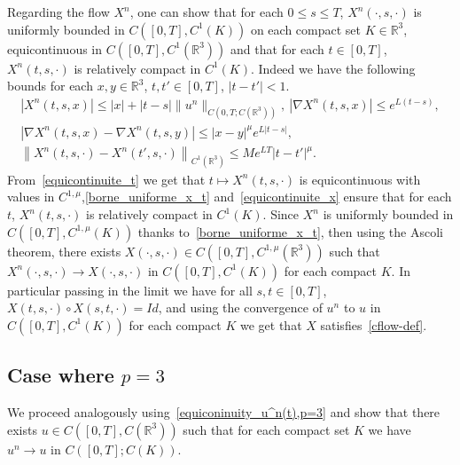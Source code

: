 \documentclass[10pt]{amsart}
\theoremstyle{definition}\newtheorem{defi}[theo]{Definition}\newtheorem{rema}[theo]{Remark}\newtheorem{exam}[theo]{Example}\newtheorem{exem}[theo]{Example}\newtheorem{nota}[theo]{Notation}
\newcommand{\R}{\mathbb{R}}
\renewcommand{\leq}{\leqslant}
\begin{document}
Regarding the flow $X^n$, one can show that for each $0 \leq s\leq T $, $X^n(\cdot,s,\cdot) $ is uniformly bounded in $ C([0,T], C^{1}(K))$ on each compact set $K\in \R^3$, equicontinuous in $ C([0,T], C^{1}(\R^3))$ and that for each $t\in[0,T]$, $X^n(t,s,\cdot)$ is relatively compact in $ C^{1}(K)$. Indeed we have the following bounds for each $x,y \in \R^3 $, $t,t'\in[0,T]$, $|t-t'|<1$.
\begin{gather}
\left|X^n(t,s,x)\right| \leq |x|+ |t-s| \|u^n\|_{ C\left(0,T; C(\R^3)\right)},\: \left|\nabla X^n(t,s,x)\right|\leq e^{L(t-s)},\label{borne_uniforme_x_t}
\\ 
\left|\nabla X^n(t,s,x)-\nabla X^n(t,s,y)\right| \leq |x-y|^\mu e^{L |t-s|},\label{equicontinuite_x}
\\ 
\left\|X^n(t,s,\cdot)-X^n(t',s,\cdot)\right\|_{ C^{1}(\R^3)} \leq Me^{LT}|t-t'|^\mu.\label{equicontinuite_t}
\end{gather}
From~\eqref{equicontinuite_t} we get that $t\mapsto X^n(t,s,\cdot) $ is equicontinuous with values in $ C^{1,\mu}$,\eqref{borne_uniforme_x_t} and~\eqref{equicontinuite_x} ensure that for each $t$, $X^n(t,s,\cdot) $ is relatively compact in $ C^1(K)$. Since $X^n$ is uniformly bounded in $ C([0,T], C^{1,\mu}(K))$ thanks to~\eqref{borne_uniforme_x_t}, then using the Ascoli theorem, there exists $X(\cdot,s,\cdot)\in C([0,T], C^{1,\mu}(\R^3)) $ such that $X^n(\cdot,s,\cdot) \to X(\cdot,s,\cdot) $ in $ C([0,T], C^1(K)) $ for each compact $K$. In particular passing in the limit we have for all $s,t\in[0,T]$, $X(t,s,\cdot) \circ X(s,t,\cdot)= Id$, and using the convergence of $u^n$ to $u$ in $ C([0,T], C^1(K))$ for each compact $K$ we get that $X$ satisfies~\eqref{cflow-def}.

\subsection*{Case where \texorpdfstring{$p=3$}{p=3}}

We proceed analogously using~\eqref{equiconinuity_u^n(t),p=3} and show that there exists $u\in C([0,T], C(\R^3)) $ such that for each compact set $K$ we have $u^n\to u$ in $ C([0,T]; C(K))$.
\end{document}
